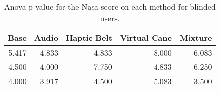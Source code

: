 
\begin{table}[!htb]
\centering
\caption{Anova p-value for the Nasa score on each method for blinded users.}
\label{tab:anova_nasa}
\begin{tabular}{rrrrr}
\toprule
 Base &  Audio &  Haptic Belt &  Virtual Cane &  Mixture \\
\midrule
5.417 &  4.833 &        4.833 &         8.000 &    6.083 \\
4.500 &  4.000 &        7.750 &         4.833 &    6.250 \\
4.000 &  3.917 &        4.500 &         5.083 &    3.500 \\
\bottomrule
\end{tabular}
\end{table}

